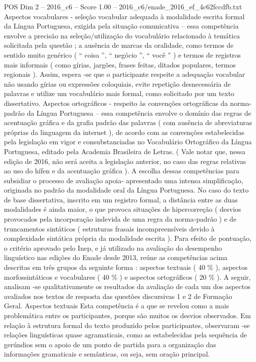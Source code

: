 \begin{textsample}{POS Dim 2 – 2016\_c6 – Score 1.00 – 2016\_c6/enade\_2016\_ef\_4c62fccdfb.txt}
Aspectos vocabulares - seleção vocabular adequada à modalidade escrita formal da Língua Portuguesa, exigida pela situação comunicativa – essa competência envolve a precisão na seleção/utilização do vocabulário relacionado à temática solicitada pela questão ; a ausência de marcas da oralidade, como termos de sentido muito genérico ( “ coisa ”, “ negócio ”, “ você ” ) e termos de registros mais informais ( como gírias, jargões, frases feitas, ditados populares, termos regionais ).
Assim, espera -se que o participante respeite a adequação vocabular não usando gírias ou expressões coloquiais, evite repetição desnecessária de palavras e utilize um vocabulário mais formal, como solicitado por um texto dissertativo.
Aspectos ortográficos - respeito às convenções ortográficas da norma-padrão da Língua Portuguesa – essa competência envolve o domínio das regras de acentuação gráfica e da grafia padrão das palavras ( com ausência de abreviaturas próprias da linguagem da internet ), de acordo com as convenções estabelecidas pela legislação em vigor e consubstanciadas no Vocabulário Ortográfico da Língua Portuguesa, editado pela Academia Brasileira de Letras. ( Vale notar que, nessa edição de 2016, não será aceita a legislação anterior, no caso das regras relativas ao uso do hífen e da acentuação gráfica ).
A escolha dessas competências para subsidiar o processo de avaliação apoia- apresentado uma intensa simplificação, originada no padrão da modalidade oral da Língua Portuguesa.
No caso do texto de base dissertativa, inscrito em um registro formal, a distância entre as duas modalidades é ainda maior, o que provoca situações de hipercorreção ( desvios provocados pela incorporação indevida de uma regra da norma-padrão ) e de truncamentos sintáticos ( estruturas frasais incompreensíveis devido à complexidade sintática própria da modalidade escrita ).
Para efeito de pontuação, o critério aprovado pelo Inep, e já utilizado na avaliação do desempenho linguístico nas edições do Enade desde 2013, reúne as competências acima descritas em três grupos da seguinte forma : aspectos textuais ( 40 \% ), aspectos morfossintáticos e vocabulares ( 40 \% ) e aspectos ortográficos ( 20 \% ).
A seguir, analisam -se qualitativamente os resultados da avaliação de cada um dos aspectos avaliados nos textos de resposta das questões discursivas 1 e 2 de Formação Geral.
Aspectos textuais Esta competência é a que se revelou como a mais problemática entre os participantes, porque são muitos os desvios observados.
Em relação à estrutura formal do texto produzido pelos participantes, observaram -se relações linguísticas quase agramaticais, como as estabelecidas pela sequência de gerúndios sem o apoio de um ponto de partida para a organização das informações gramaticais e semânticas, ou seja, sem oração principal.

\end{textsample}
